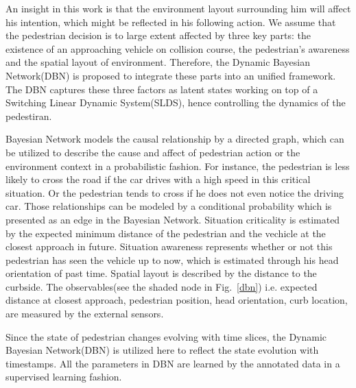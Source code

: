 \documentclass[10pt,twocolumn,letterpaper]{article}
\begin{document}
    An insight in this work is that the 
    environment layout surrounding him will affect his intention, which might be 
    reflected in his following action. We assume that the pedestrian decision
    is to large extent affected by three key parts: the existence of an approaching
    vehicle on collision course, the pedestrian's awareness and the spatial
    layout of environment. Therefore, the Dynamic Bayesian Network(DBN) is proposed to 
    integrate these parts into an unified framework. The DBN captures these three 
    factors as latent states working on top of a Switching Linear Dynamic System(SLDS),
    hence controlling the dynamics of the pedestiran. 

    Bayesian Network models the causal relationship by a directed graph, which
    can be utilized to describe the cause and affect of pedestrian action or 
    the environment context in a probabilistic fashion. For instance, the pedestrian
    is less likely to cross the road if the car drives with a high speed in this
    critical situation. Or the pedestrian tends to cross if he does not even notice
    the driving car. Those relationships can be modeled by a conditional probability
    which is presented as an edge in the Bayesian Network. Situation criticality
    is estimated by the expected minimum distance of the pedestrian and the vechicle
    at the closest approach in future. Situation awareness represents whether or not
    this pedestrian has seen the vehicle up to now, which is estimated through 
    his head orientation of past time. Spatial layout is described by
    the distance to the curbside. The observables(see the shaded node in Fig.~\ref{dbn})
    i.e. expected distance at closest approach, pedestrian position, head orientation,
    curb location, are measured by the external sensors.
    
    Since the state of pedestrian 
    changes evolving with time slices, the Dynamic Bayesian Network(DBN) is utilized here
    to reflect the state evolution with timestamps. All the parameters in DBN are learned
    by the annotated data in a supervised learning fashion.
\end{document}
